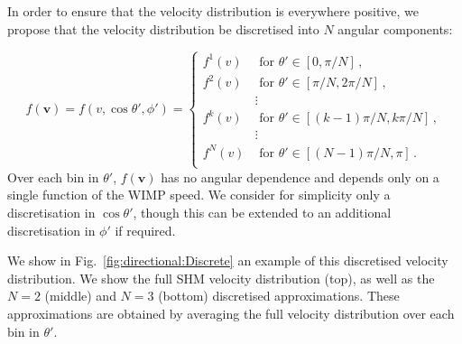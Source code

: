 In order to ensure that the velocity distribution is everywhere positive, we propose that the velocity distribution be discretised into $N$ angular components:

\begin{equation}
f(\textbf{v}) = f(v, \cos\theta', \phi') =
\begin{cases}
f^1(v) & \textrm{ for } \theta' \in \left[ 0, \pi/N\right]\,, \\
f^2(v) & \textrm{ for } \theta' \in \left[ \pi/N, 2\pi/N\right]\,, \\
 & \vdots\\
f^k(v) & \textrm{ for } \theta' \in \left[ (k-1)\pi/N, k\pi/N\right]\,, \\
 & \vdots\\
f^N(v) & \textrm{ for } \theta' \in \left[ (N-1)\pi/N, \pi\right]\,. \\
\end{cases}
\end{equation}
Over each bin in $\theta'$, $f(\textbf{v})$ has no angular dependence and depends only on a single function of the WIMP speed. We consider for simplicity only a discretisation in $\cos\theta'$, though this can be extended to an additional discretisation in $\phi'$ if required. 


We show in Fig.~\ref{fig:directional:Discrete} an example of this discretised velocity distribution. We show the full SHM velocity distribution (top), as well as the $N=2$ (middle) and $N=3$ (bottom) discretised approximations. These approximations are obtained by averaging the full velocity distribution over each bin in $\theta'$.


